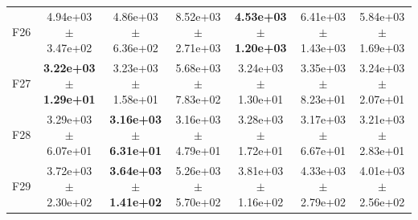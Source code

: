 \begin{table}
{\begin{tabular}{lcccccc}
F26 & 4.94e+03 $\pm$ 3.47e+02 & 4.86e+03 $\pm$ 6.36e+02 & 8.52e+03 $\pm$ 2.71e+03 & \textbf{4.53e+03 $\pm$ 1.20e+03} & 6.41e+03 $\pm$ 1.43e+03 & 5.84e+03 $\pm$ 1.69e+03 \\
F27 & \textbf{3.22e+03 $\pm$ 1.29e+01} & 3.23e+03 $\pm$ 1.58e+01 & 5.68e+03 $\pm$ 7.83e+02 & 3.24e+03 $\pm$ 1.30e+01 & 3.35e+03 $\pm$ 8.23e+01 & 3.24e+03 $\pm$ 2.07e+01 \\
F28 & 3.29e+03 $\pm$ 6.07e+01 & \textbf{3.16e+03 $\pm$ 6.31e+01} & 3.16e+03 $\pm$ 4.79e+01 & 3.28e+03 $\pm$ 1.72e+01 & 3.17e+03 $\pm$ 6.67e+01 & 3.21e+03 $\pm$ 2.83e+01 \\
F29 & 3.72e+03 $\pm$ 2.30e+02 & \textbf{3.64e+03 $\pm$ 1.41e+02} & 5.26e+03 $\pm$ 5.70e+02 & 3.81e+03 $\pm$ 1.16e+02 & 4.33e+03 $\pm$ 2.79e+02 & 4.01e+03 $\pm$ 2.56e+02 \\
\bottomrule
\end{tabular}%
}
\end{table}
